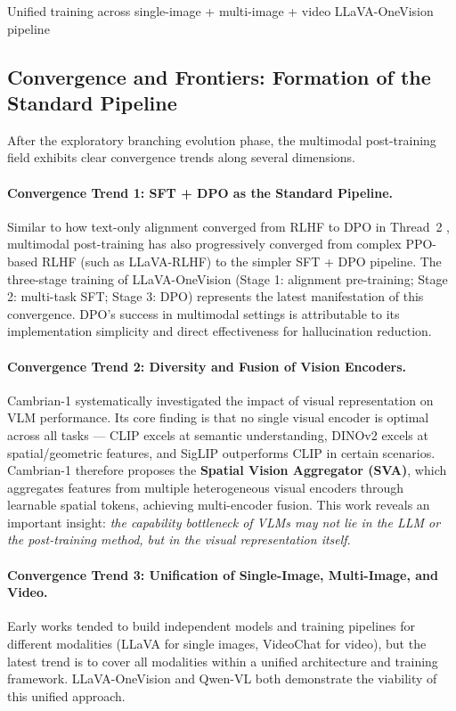   {Unified training across single-image + multi-image + video}
  {LLaVA-OneVision pipeline}

\subsection{Convergence and Frontiers: Formation of the Standard Pipeline}
\label{sec:t5-convergence}

After the exploratory branching evolution phase, the multimodal post-training field exhibits clear convergence trends along several dimensions.

\paragraph{Convergence Trend 1: SFT + DPO as the Standard Pipeline.}
Similar to how text-only alignment converged from RLHF to DPO in Thread~2
,
multimodal post-training has also progressively converged from complex PPO-based RLHF (such as LLaVA-RLHF)
to the simpler SFT + DPO pipeline.
The three-stage training of LLaVA-OneVision \cite{li2024llava-onevision}
(Stage 1: alignment pre-training; Stage 2: multi-task SFT; Stage 3: DPO)
represents the latest manifestation of this convergence.
DPO's success in multimodal settings is attributable to its implementation simplicity
and direct effectiveness for hallucination reduction.

\paragraph{Convergence Trend 2: Diversity and Fusion of Vision Encoders.}
Cambrian-1 \cite{tong2024cambrian} systematically investigated the impact of visual representation on VLM performance.
Its core finding is that
no single visual encoder is optimal across all tasks ---
CLIP excels at semantic understanding, DINOv2 excels at spatial/geometric features,
and SigLIP outperforms CLIP in certain scenarios.
Cambrian-1 therefore proposes the \textbf{Spatial Vision Aggregator (SVA)},
which aggregates features from multiple heterogeneous visual encoders through learnable spatial tokens,
achieving multi-encoder fusion.
This work reveals an important insight:
\textit{the capability bottleneck of VLMs may not lie in the LLM or the post-training method,
but in the visual representation itself}.

\paragraph{Convergence Trend 3: Unification of Single-Image, Multi-Image, and Video.}
Early works tended to build independent models and training pipelines for different modalities
(LLaVA for single images, VideoChat for video),
but the latest trend is to cover all modalities within a unified architecture and training framework.
LLaVA-OneVision \cite{li2024llava-onevision} and
Qwen-VL \cite{bai2023qwen-vl} both demonstrate the viability of this unified approach.

